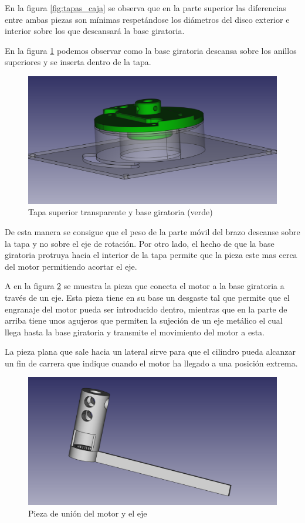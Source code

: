 En la figura \ref{fig:tapas_caja} se observa que en la parte superior las diferencias entre ambas piezas son mínimas respetándose los diámetros del disco exterior e interior sobre los que descansará la base giratoria.

En la figura \ref{fig:tapas_caja_con_disco} podemos observar como la base giratoria descansa sobre los anillos superiores y se inserta dentro de la tapa.

 \begin{figure}[H]
    \centering
    \includegraphics[width=.9\linewidth]{pictures/TapaSuperiorConDisco.png}
    \caption{Tapa superior transparente y base giratoria (verde)}
    \label{fig:tapas_caja_con_disco}
\end{figure}

De esta manera se consigue que el peso de la parte móvil del brazo descanse sobre la tapa y no sobre el eje de rotación. Por otro lado, el hecho de que la base giratoria protruya hacia el interior de la tapa permite que la pieza este mas cerca del motor permitiendo acortar el eje.

A en la figura \ref{fig:cilindro_con_pletina} se muestra la pieza que conecta el motor a la base giratoria a través de un eje. Esta pieza tiene en su base un desgaste tal que permite que el engranaje del motor pueda ser introducido dentro, mientras que en la parte de arriba tiene unos agujeros que permiten la sujeción de un eje metálico el cual llega hasta la base giratoria y transmite el movimiento del motor a esta.

La pieza plana que sale hacia un lateral sirve para que el cilindro pueda alcanzar un fin de carrera que indique cuando el motor ha llegado a una posición extrema.

\begin{figure}[H]
    \centering
    \includegraphics[width=.9\linewidth]{pictures/CilindroConPletina.png}
    \caption{Pieza de unión del motor y el eje}
    \label{fig:cilindro_con_pletina}
\end{figure}


